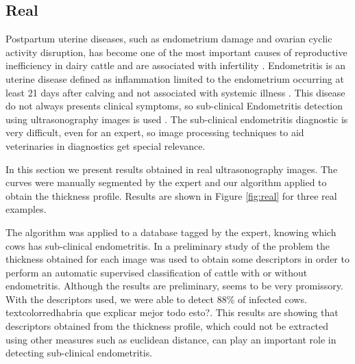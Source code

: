 \documentclass{article}
\begin{document}
\subsection{Real}
\label{ssec:real}
Postpartum uterine diseases, such as endometrium damage and ovarian
cyclic activity disruption, has become one of the most important
causes of reproductive inefficiency in dairy cattle and are associated
with infertility \cite{sheldon2008,barlund2008}. Endometritis is an
uterine disease defined as inflammation limited to the endometrium
occurring at least 21 days after calving and not associated with
systemic illness \cite{sheldon2010}. This disease do not always
presents clinical symptoms, so sub-clinical Endometritis detection
using ultrasonography images is used \cite{Gianni2010,
  Gianni2013}. The sub-clinical endometritis diagnostic is very
difficult, even for an expert, so image processing techniques to aid
veterinaries in diagnostics get special relevance.

In this section we present results obtained in real ultrasonography
images. The curves were manually segmented by the expert and our
algorithm applied to obtain the thickness profile. Results are shown
in Figure \ref{fig:real} for three real examples.

The algorithm was applied to a database tagged by the expert, knowing
which cows has sub-clinical endometritis. In a preliminary study of
the problem the thickness obtained for each image was used to obtain
some descriptors in order to perform an automatic supervised
classification of cattle with or without endometritis. Although the
results are preliminary, seems to be very promissory. With the
descriptors used, we were able to detect 88\% of infected
cows. textcolor{red}{habria que explicar mejor todo esto?}. This
results are showing that descriptors obtained from the thickness
profile, which could not be extracted using other measures such as
euclidean distance, can play an important role in detecting
sub-clinical endometritis.
\end{document}
